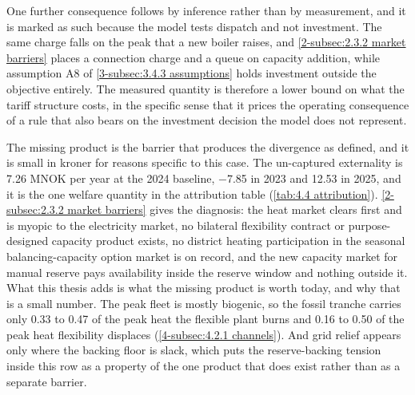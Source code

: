 One further consequence follows by inference rather than by measurement, and it is marked as such because the model tests dispatch and not investment. The same charge falls on the peak that a new boiler raises, and \autoref{2-subsec:2.3.2 market barriers} places a connection charge and a queue on capacity addition, while assumption A8 of \autoref{3-subsec:3.4.3 assumptions} holds investment outside the objective entirely. The measured quantity is therefore a lower bound on what the tariff structure costs, in the specific sense that it prices the operating consequence of a rule that also bears on the investment decision the model does not represent.

The missing product is the barrier that produces the divergence as defined, and it is small in kroner for reasons specific to this case. The un-captured externality is 7.26 MNOK per year at the 2024 baseline, $-$7.85 in 2023 and 12.53 in 2025, and it is the one welfare quantity in the attribution table (\autoref{tab:4.4 attribution}). \autoref{2-subsec:2.3.2 market barriers} gives the diagnosis: the heat market clears first and is myopic to the electricity market, no bilateral flexibility contract or purpose-designed capacity product exists, no district heating participation in the seasonal balancing-capacity option market is on record, and the new capacity market for manual reserve pays availability inside the reserve window and nothing outside it. What this thesis adds is what the missing product is worth today, and why that is a small number. The peak fleet is mostly biogenic, so the fossil tranche carries only 0.33 to 0.47 of the peak heat the flexible plant burns and 0.16 to 0.50 of the peak heat flexibility displaces (\autoref{4-subsec:4.2.1 channels}). And grid relief appears only where the backing floor is slack, which puts the reserve-backing tension inside this row as a property of the one product that does exist rather than as a separate barrier.

